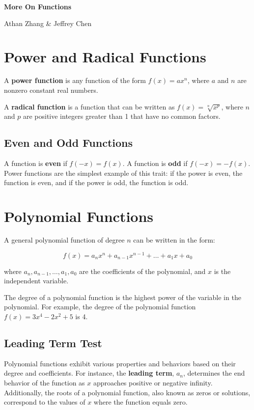 \documentclass[11pt]{article}
\begin{document}
\textbf{\Huge More On Functions}

Athan Zhang \& Jeffrey Chen

\section{Power and Radical Functions}

A \textbf{power function} is any function of the form $f(x) = ax^{n}$, where $a$ and $n$ are nonzero constant real numbers. 

A \textbf{radical function} is a function that can be written as $f(x) = \sqrt[n]{x^{p}}$, where $n$ and $p$ are positive integers greater than 1 that have no common factors. 

\subsection{Even and Odd Functions}

A function is \textbf{even} if $f(-x) = f(x)$. A function is \textbf{odd} if $f(-x) = -f(x)$. Power functions are the simplest example of this trait: if the power is even, the function is even, and if the power is odd, the function is odd.

\section{Polynomial Functions}


A general polynomial function of degree $n$ can be written in the form:

\[
f(x) = a_nx^n + a_{n-1}x^{n-1} + \ldots + a_1x + a_0
\]

where $a_n, a_{n-1}, \ldots, a_1, a_0$ are the coefficients of the polynomial, and $x$ is the independent variable.

The degree of a polynomial function is the highest power of the variable in the polynomial. For example, the degree of the polynomial function $f(x) = 3x^4 - 2x^2 + 5$ is 4.


\subsection{Leading Term Test}

Polynomial functions exhibit various properties and behaviors based on their degree and coefficients. For instance, the \textbf{leading term}, $a_n$, determines the end behavior of the function as $x$ approaches positive or negative infinity. Additionally, the roots of a polynomial function, also known as zeros or solutions, correspond to the values of $x$ where the function equals zero.
\end{document}
